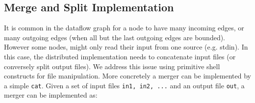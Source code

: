 \documentclass[sigplan,10pt,review,anonymous]{acmart}
\newcommand{\nv}[1]{[{\color{cyan}#1 --- nv}]}
\newcommand{\kk}[1]{[{\color{magenta}#1 --- kk}]}
\newcommand{\tr}[1]{} %
\begin{document}



% 
% 
% 
% 
% 
% 
\subsection{Merge and Split Implementation}

It is common in the dataflow graph for a node to have many incoming
edges, or many outgoing edges (when all but the last outgoing edges
are bounded). However some nodes, might only read their input from one
source (e.g. stdin). In this case, the distributed implementation
needs to concatenate input files (or conversely split output
files).
%
%
We address this issue using primitive shell constructs for file
manipulation. More concretely a merger can be implemented by a simple
\verb|cat|. Given a set of input files \verb|in1, in2, ...| and an
output file \verb|out|, a merger can be implemented as:
\end{document}

